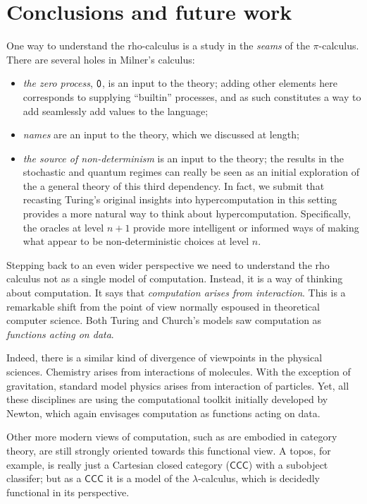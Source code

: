 \section{Conclusions and future work}

One way to understand the rho-calculus is a study in the \emph{seams}
of the $\pi$-calculus. There are several holes in Milner's calculus:

\begin{itemize}
  \item \emph{the zero process}, $\mathsf{0}$, is an input to the theory;
    adding other elements here corresponds to supplying ``builtin''
    processes, and as such constitutes a way to add seamlessly add
    values to the language;
  \item \emph{names} are an input to the theory, which we discussed at length;
  \item \emph{the source of non-determinism} is an input to the
    theory; the results in the stochastic and quantum regimes can
    really be seen as an initial exploration of the a general theory
    of this third dependency. In fact, we submit that recasting
    Turing's original insights into hypercomputation
    \cite{WIKI:TuringHyperComputation} in this setting provides a more
    natural way to think about hypercomputation. Specifically, the
    oracles at level $n+1$ provide more intelligent or informed ways
    of making what appear to be non-deterministic choices at level
    $n$.
\end{itemize}

Stepping back to an even wider perspective we need to understand the
rho calculus not as a single model of computation. Instead, it is a
way of thinking about computation. It says that \emph{computation
  arises from interaction}. This is a remarkable shift from the point
of view normally espoused in theoretical computer science. Both Turing
and Church's models saw computation as \emph{functions acting on
  data}.

Indeed, there is a similar kind of divergence of viewpoints in the
physical sciences. Chemistry arises from interactions of
molecules. With the exception of gravitation, standard model physics
arises from interaction of particles. Yet, all these disciplines are
using the computational toolkit initially developed by Newton, which
again envisages computation as functions acting on data.

Other more modern views of computation, such as are embodied in
category theory, are still strongly oriented towards this functional
view. A topos, for example, is really just a Cartesian closed category
($\mathsf{CCC}$) with a subobject classifer; but as a $\mathsf{CCC}$
it is a model of the $\lambda$-calculus, which is decidedly functional
in its perspective.

